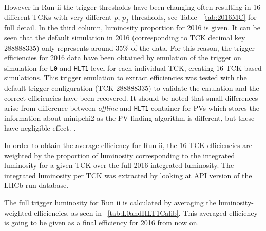 However in Run \Rn{2} the trigger thresholds have been changing often resulting in 16 different TCKs with very different $p$, $p_{T}$ thresholds, see Table ~\autoref{tab:2016MC} for full detail. In the third column, luminosity proportion for 2016 is given. It can be seen that the default simulation in 2016 (corresponding to TCK decimal key 288888335) only represents around 35\% of the data. For this reason, the trigger efficiencies for 2016 data have been obtained by emulation of the trigger on simulation for \texttt{L0} and \texttt{HLT1} level for each individual TCK, creating 16 TCK-based simulations.  This trigger emulation to extract efficiencies was tested with the default trigger configuration (TCK 288888335) to validate the emulation and the correct efficiencies have been recovered. It should be noted that small differences arise from difference between \textit{offline} and \texttt{HLT1} container for \gls{PV}s which stores the information about \gls{minipchi2} as the \gls{PV} finding-algorithm is different, but these have negligible effect. .

In order to obtain the average efficiency for Run \Rn{2}, the 16 TCK efficiencies are weighted by the proportion of luminosity corresponding to the integrated luminosity for a given TCK over the full 2016 integrated luminosity. The integrated luminosity per TCK was extracted by looking at API version of the \gls{LHCb} run database. 

The full trigger luminosity for Run \Rn{2} is calculated by averaging the luminosity-weighted efficiencies, as seen in ~\autoref{tab:L0andHLT1Calib}. This averaged efficiency is going to be given as a final efficiency for 2016 from now on.  



